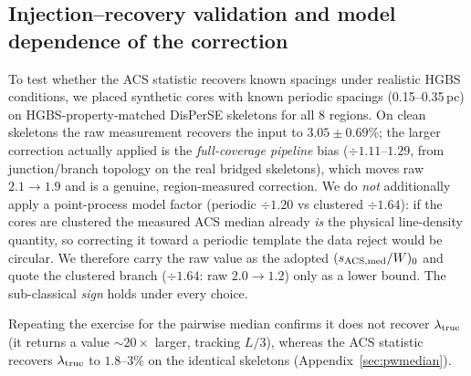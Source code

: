 \documentclass[usenatbib,twoside,twocolumn]{mnras}
\begin{document}
\subsection{Injection--recovery validation and model dependence of the correction}
\label{sec:injection_recovery}

To test whether the ACS statistic recovers known spacings under realistic HGBS conditions, we placed synthetic cores with known periodic spacings (0.15--0.35\,pc) on HGBS-property-matched DisPerSE skeletons for all 8 regions. On clean skeletons the raw measurement recovers the input to $3.05\pm0.69$\%; the larger correction actually applied is the \emph{full-coverage pipeline} bias ($\div1.11$--$1.29$, from junction/branch topology on the real bridged skeletons), which moves raw $2.1\to1.9$ and is a genuine, region-measured correction. We do \emph{not} additionally apply a point-process model factor (periodic $\div1.20$ vs clustered $\div1.64$): if the cores are clustered the measured ACS median already \emph{is} the physical line-density quantity, so correcting it toward a periodic template the data reject would be circular. We therefore carry the raw value as the adopted $(s_{\rm ACS,med}/W)_0$ and quote the clustered branch ($\div1.64$: raw $2.0\to1.2$) only as a lower bound. The sub-classical \emph{sign} holds under every choice.

Repeating the exercise for the pairwise median confirms it does not recover $\lambda_{\rm true}$ (it returns a value $\sim$$20\times$ larger, tracking $L/3$), whereas the ACS statistic recovers $\lambda_{\rm true}$ to $1.8$--$3\%$ on the identical skeletons (Appendix~\ref{sec:pwmedian}).
\end{document}

